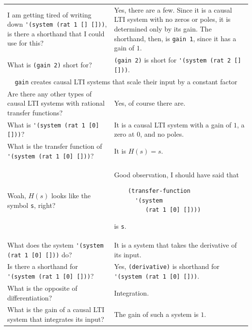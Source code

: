 \documentclass[11pt,letter]{article}
\begin{document}
\begin{longtable}{ p{} p{} }
  I am getting tired of writing down \lstinline!'(system (rat 1 [] []))!, is there a shorthand that I could use for this?
  &
  Yes, there are a few.
  Since it is a causal LTI system with no zeros or poles, it is determined only by its gain.
  The shorthand, then, is \lstinline!gain 1!, since it has a gain of $1$. \\

  What is \lstinline!(gain 2)! short for?
  &
  \lstinline!(gain 2)! is short for \lstinline!'(system (rat 2 [] []))!.\\

  \midrule

  \multicolumn{2}{c}{\Large\lstinline!gain! creates causal LTI systems that scale their input by a constant factor} \\

  \midrule

  Are there any other types of causal LTI systems with rational transfer functions?
  &
  Yes, of course there are. \\

  What is \lstinline!'(system (rat 1 [0] []))!?
  &
  It is a causal LTI system with a gain of $1$, a zero at $0$, and no poles. \\

  What is the transfer function of \lstinline!'(system (rat 1 [0] []))!?
  &
  It is $H(s)=s$. \\

  Woah, $H(s)$ looks like the symbol \lstinline!s!, right?
  &
  Good observation, I should have said that
  \begin{lstlisting}
    (transfer-function
      '(system
         (rat 1 [0] [])))
  \end{lstlisting}
  is \lstinline!s!. \\

  What does the system \lstinline!'(system (rat 1 [0] []))! do?
  &
  It is a system that takes the derivative of its input. \\

  Is there a shorthand for \lstinline!'(system (rat 1 [0] []))!?
  &
  Yes, \lstinline!(derivative)! is shorthand for \lstinline!'(system (rat 1 [0] []))!. \\

  What is the opposite of differentiation?
  &
  Integration. \\

  What is the gain of a causal LTI system that integrates its input?
  &
  The gain of such a system is $1$. \\


\end{longtable}
\end{document}
